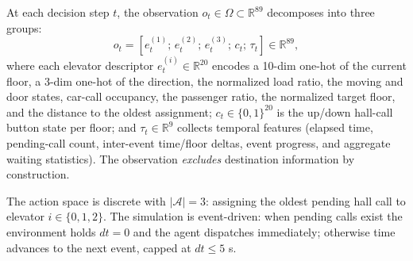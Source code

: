 \documentclass{IEEEcsmag}
\begin{document}
At each decision step $t$, the observation $o_t \in \Omega \subset
\mathbb{R}^{89}$ decomposes into three groups:
\begin{equation}
o_t = \left[ e_t^{(1)};\, e_t^{(2)};\, e_t^{(3)};\, c_t;\, \tau_t
\right] \in \mathbb{R}^{89},
\end{equation}
where each elevator descriptor $e_t^{(i)} \in \mathbb{R}^{20}$
encodes a 10-dim one-hot of the current floor, a 3-dim one-hot of the
direction, the normalized load ratio, the moving and door states,
car-call occupancy, the passenger ratio, the normalized target floor,
and the distance to the oldest assignment; $c_t \in \{0,1\}^{20}$ is
the up/down hall-call button state per floor; and
$\tau_t \in \mathbb{R}^{9}$ collects temporal features (elapsed time,
pending-call count, inter-event time/floor deltas, event progress,
and aggregate waiting statistics). The observation \emph{excludes}
destination information by construction.

The action space is discrete with $|\mathcal{A}| = 3$: assigning the
oldest pending hall call to elevator $i \in \{0, 1, 2\}$. The
simulation is event-driven: when pending calls exist the environment
holds $dt = 0$ and the agent dispatches immediately; otherwise time
advances to the next event, capped at $dt \le 5$ s.
\end{document}

